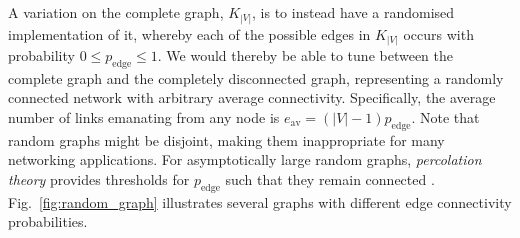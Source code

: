 \documentclass[aps,rmp,twocolumn,amsmath,amssymb,nofootinbib,superscriptaddress,longbibliography,floatfix,table-of-contents,eqsecnum]{revtex4-1}
\begin{document}
A variation on the complete graph, $K_{|V|}$, is to instead have a randomised implementation of it, whereby each of the possible edges in $K_{|V|}$ occurs with probability \mbox{$0\leq p_\text{edge}\leq 1$}. We would thereby be able to tune between the complete graph and the completely disconnected graph, representing a randomly connected network with arbitrary average connectivity. Specifically, the average number of links emanating from any node is \mbox{$e_\text{av} = (|V|-1)p_\text{edge}$}. Note that random graphs might be disjoint, making them inappropriate for many networking applications. For asymptotically large random graphs, \textit{percolation theory} \cite{???} provides thresholds for $p_\text{edge}$ such that they remain connected \cite{???}. Fig.~\ref{fig:random_graph} illustrates several graphs with different edge connectivity probabilities.
\end{document}
